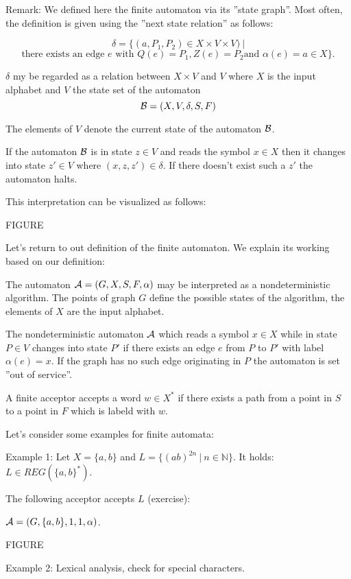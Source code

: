 Remark: We defined here the finite automaton via its ''state graph''. Most
often, the definition is given using the ''next state relation'' as follows:

\[ \delta = \{ (a, P_1, P_2) \in X \times V \times V)\ | \]
\[ \mbox{there exists an edge } e \mbox{ with } Q(e) = P_1, Z(e) = P_2 \mbox{
and } \alpha(e) = a \in X \}. \]

$\delta$ my be regarded as a relation between $X \times V$ and $V$ where $X$ is
the input alphabet and $V$ the state set of the automaton \[ \mbox{$\mathcal{B}$} = (X,
V, \delta, S, F) \]

The elements of $V$ denote the current state of the automaton $\mbox{$\mathcal{B}$}$.

If the automaton $\mbox{$\mathcal{B}$}$ is in state $z \in V$ and reads the symbol $x
\in X$ then it changes into state $z' \in V$ where $(x, z, z') \in \delta$. If
there doesn't exist such a $z'$ the automaton halts.

This interpretation can be visualized as follows:

FIGURE

Let's return to out definition of the finite automaton. We explain its
working based on our definition:

The automaton $\mbox{$\mathcal{A}$} = (G, X, S, F, \alpha)$ may be interpreted as a
nondeterministic algorithm. The points of graph $G$ define the possible states
of the algorithm, the elements of $X$ are the input alphabet.

The nondeterministic automaton $\mbox{$\mathcal{A}$}$ which reads a symbol $x \in X$
while in state $P \in V$ changes into state $P'$ if there exists an edge $e$
from $P$ to $P'$ with label $\alpha(e) = x$. If the graph has no such edge
originating in $P$ the automaton is set ''out of service''.

A finite acceptor accepts a word $w \in X^*$ if there exists a path from a point
in $S$ to a point in $F$ which is labeld with $w$.

Let's consider some examples for finite automata:

Example 1: Let $X = \{ a, b \}$ and $L = \{ (a b)^{2n}\ |\ n \in \mathbb{N} \}$.
It holds: $L \in REG(\{a, b\}^*)$.

The following acceptor accepts $L$ (exercise):

$\mbox{$\mathcal{A}$} = (G, \{a, b\}, {1}, {1}, \alpha)$.

FIGURE

Example 2: Lexical analysis, check for special characters.

